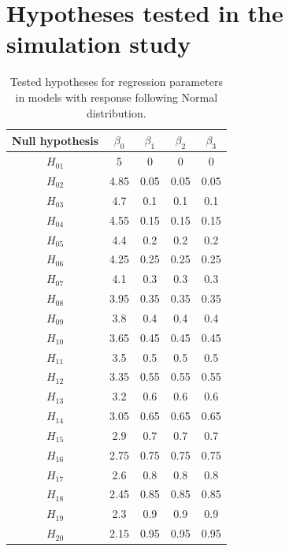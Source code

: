 \documentclass[USenglish]{article}
\theoremstyle{dgthm}
\theoremstyle{dgdef}
\begin{document}



\appendix

\section{Hypotheses tested in the simulation study\label{app1}}


\begin{table}[H]
\centering
\begin{tabular}{c|cccc}
\hline
Null hypothesis & $\beta_0$ & $\beta_1$ & $\beta_2$ & $\beta_3$ \\ \hline
$H_{01}$      & 5         & 0         & 0         & 0         \\
$H_{02}$      & 4.85      & 0.05      & 0.05      & 0.05      \\
$H_{03}$      & 4.7       & 0.1       & 0.1       & 0.1       \\
$H_{04}$      & 4.55      & 0.15      & 0.15      & 0.15      \\
$H_{05}$      & 4.4       & 0.2       & 0.2       & 0.2       \\
$H_{06}$      & 4.25      & 0.25      & 0.25      & 0.25      \\
$H_{07}$      & 4.1       & 0.3       & 0.3       & 0.3       \\
$H_{08}$      & 3.95      & 0.35      & 0.35      & 0.35      \\
$H_{09}$      & 3.8       & 0.4       & 0.4       & 0.4       \\
$H_{10}$      & 3.65      & 0.45      & 0.45      & 0.45      \\
$H_{11}$      & 3.5       & 0.5       & 0.5       & 0.5       \\
$H_{12}$      & 3.35      & 0.55      & 0.55      & 0.55      \\
$H_{13}$      & 3.2       & 0.6       & 0.6       & 0.6       \\
$H_{14}$      & 3.05      & 0.65      & 0.65      & 0.65      \\
$H_{15}$      & 2.9       & 0.7       & 0.7       & 0.7       \\
$H_{16}$      & 2.75      & 0.75      & 0.75      & 0.75      \\
$H_{17}$      & 2.6       & 0.8       & 0.8       & 0.8       \\
$H_{18}$      & 2.45      & 0.85      & 0.85      & 0.85      \\
$H_{19}$      & 2.3       & 0.9       & 0.9       & 0.9       \\
$H_{20}$      & 2.15      & 0.95      & 0.95      & 0.95      \\ \hline
\end{tabular}
\caption{Tested hypotheses for regression parameters in models with response following Normal distribution.}
\label{tab:hipoteses_beta_normal}
\end{table}
\end{document}

